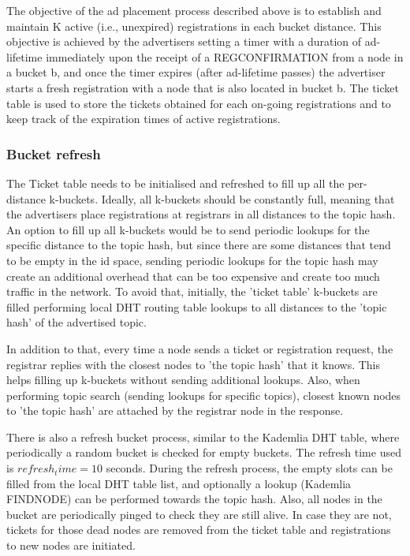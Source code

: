 The objective of the ad placement process described above is to establish and maintain K active (i.e., unexpired) registrations in each bucket distance. This objective is achieved by the advertisers setting a timer with a duration of ad-lifetime immediately upon the receipt of a REGCONFIRMATION from a node in a bucket b, and once the timer expires (after ad-lifetime passes) the advertiser starts a fresh registration with a node that is also located in bucket b. The ticket table is used to store the tickets obtained for each on-going registrations and to keep track of the expiration times of active registrations.

\subsubsection{Bucket refresh}

The Ticket table needs to be initialised and refreshed to fill up all the per-distance k-buckets. Ideally, all k-buckets should be constantly full, meaning that the advertisers place registrations at registrars in all distances to the topic hash. An option to fill up all k-buckets would be to send periodic lookups for the specific distance to the topic hash, but since there are some distances that tend to be empty in the id space, sending periodic lookups for the topic hash may create an additional overhead that can be too expensive and create too much traffic in the network. To avoid that, initially, the 'ticket table' k-buckets are filled performing local DHT routing table lookups to all distances to the 'topic hash' of the advertised topic.

In addition to that, every time a node sends a ticket or registration request, the registrar replies with the closest nodes to 'the topic hash' that it knows. This helps filling up k-buckets without sending additional lookups. Also, when performing topic search (sending lookups for specific topics), closest known nodes to 'the topic hash' are attached by the registrar node in the response.

There is also a refresh bucket process, similar to the Kademlia DHT table, where periodically a random bucket is checked for empty buckets. The refresh time used is $refresh_time=10$ seconds. During the refresh process, the empty slots can be filled from the local DHT table list, and optionally a lookup (Kademlia FINDNODE) can be performed towards the topic hash. Also, all nodes in the bucket are periodically pinged to check they are still alive. In case they are not, tickets for those dead nodes are removed from the ticket table and registrations to new nodes are initiated.


